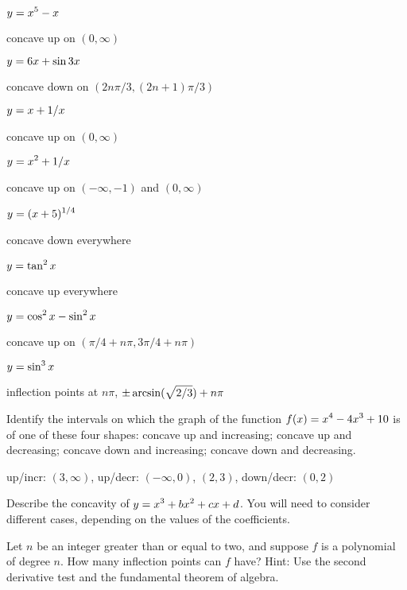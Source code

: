 \begin{exercises}
\exercise $\displaystyle y= x^5 - x$
\begin{answer} concave up on $(0,\infty)$
\end{answer}

\exercise $\displaystyle y = 6x + \sin 3x$
\begin{answer} concave down on $(2n\pi/3,(2n+1)\pi/3)$
\end{answer}

\exercise $\displaystyle y = x+ 1/x$
\begin{answer} concave up on $(0,\infty)$
\end{answer}

\exercise $\displaystyle y = x^2+ 1/x$
\begin{answer} concave up on $(-\infty,-1)$ and $(0,\infty)$
\end{answer}

\exercise $\displaystyle y = (x+5)^{1/4}$
\begin{answer} concave down everywhere
\end{answer}

\exercise $\displaystyle y = \tan^2 x$
\begin{answer} concave up everywhere
\end{answer}

\exercise $\displaystyle y =\cos^2 x - \sin^2 x$
\begin{answer} concave up on $(\pi/4+n\pi,3\pi/4+n\pi)$
\end{answer}

\exercise $\displaystyle y = \sin^3 x$
\begin{answer} inflection points at $n\pi$, $\displaystyle \pm\arcsin(\sqrt{2/3})+n\pi$
\end{answer}

\endtwocol

\msk \exercise Identify the intervals on which the graph of the function
$\displaystyle f(x) = x^4-4x^3 +10$ is of one of these four
shapes: concave up and increasing; concave up and decreasing; concave
down and increasing; concave down and decreasing.
\begin{answer} up/incr: $(3,\infty)$, up/decr: $(-\infty,0)$, $(2,3)$,
down/decr: $(0,2)$
\end{answer}

\exercise Describe the concavity of $\displaystyle y =  x^3 + bx^2 + cx + d$.
You will need to consider different cases, depending on the values of
the coefficients.

\exercise Let $n$ be an integer greater than or equal to
two, and suppose $f$ is a polynomial of degree $n$. How many inflection points
can $f$ have?  Hint: Use the second derivative test and the
fundamental theorem of algebra.


\end{exercises}
